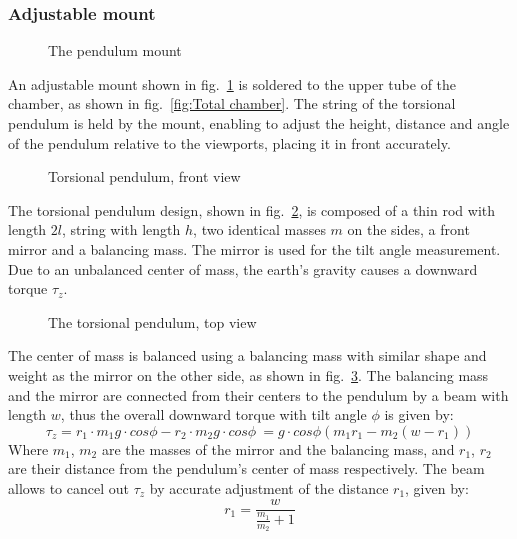 \documentclass[\main/master.tex]{subfiles}
\begin{document}
\subsubsection{Adjustable mount}
\begin{figure}[htbp]
	\centering
	\caption[The pendulum mount]{The pendulum mount}
	\label{fig:mount}
\end{figure}
\FloatBarrier
\par\noindent
An adjustable mount shown in fig.~\ref{fig:mount} is soldered to the upper tube of the chamber, as shown in fig.~\ref{fig:Total chamber}. The string of the torsional pendulum is held by the mount, enabling to adjust the height, distance and angle of the pendulum relative to the viewports, placing it in front accurately. 
\begin{figure}[htbp]
	\centering
	\caption[Torsional pendulum, front view]{Torsional pendulum, front view}
	\label{fig:pendulum front}
\end{figure}
\FloatBarrier
\par\noindent
The torsional pendulum design, shown in fig.~\ref{fig:pendulum front}, is composed of a thin rod with length $2l$, string with length $h$, two identical masses $m$ on the sides, a front mirror and a balancing mass. The mirror is used for the tilt angle measurement. Due to an unbalanced center of mass, the earth's gravity causes a downward torque $\tau_z$. 
\begin{figure}[htbp]
	\centering
	\caption[The torsional pendulum, top view]{The torsional pendulum, top view}
	\label{fig:pendulum top}
\end{figure}
\FloatBarrier 
\par\noindent
The center of mass is balanced using a balancing mass with similar shape and weight as the mirror on the other side, as shown in fig.~\ref{fig:pendulum top}. The balancing mass and the mirror are connected from their centers to the pendulum by a beam with length $w$, thus the overall downward torque with tilt angle $\phi$ is given by:
\begin{equation}
\tau_z = r_1\cdot m_1 g \cdot cos\phi - r_2\cdot m_2 g \cdot cos \phi\ = g\cdot cos\phi( m_1 r_1  - m_2 (w-r_1) )    \label{eqn:downward torque}
\end{equation}
Where $m_1$, $m_2$ are the masses of the mirror and the balancing mass, and $r_1$, $r_2$ are their distance from the pendulum's center of mass respectively. The beam allows to cancel out $\tau_z$ by accurate adjustment of the distance $r_1$, given by: 
\begin{equation}
 r_1 = \frac{w}{\frac{m_1}{m_2}+1}  \label{eqn:downward torque cancelled}
\end{equation}
\end{document}
